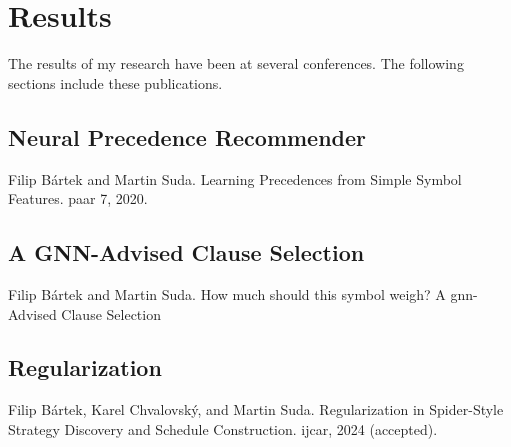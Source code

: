 \chapter{Results}

The results of my research have been at several conferences.
The following sections include these publications.

%

\section{Neural Precedence Recommender}
\label{sec:results:npr}

Filip Bártek and Martin Suda. Learning Precedences from Simple Symbol Features. \Gls{paar} 7, 2020. \cite{DBLP:conf/cade/Bartek020}



\section{A GNN-Advised Clause Selection}
\label{sec:results:gnn}

Filip Bártek and Martin Suda. How much should this symbol weigh? A \acrshort{gnn}-Advised Clause Selection \cite{DBLP:conf/lpar/Bartek023}



\section{Regularization}
\label{sec:results:regularization}

Filip Bártek, Karel Chvalovský, and Martin Suda. Regularization in Spider-Style Strategy Discovery and Schedule Construction. \Gls{ijcar}, 2024 (accepted). \cite{bartek2024regularization}


